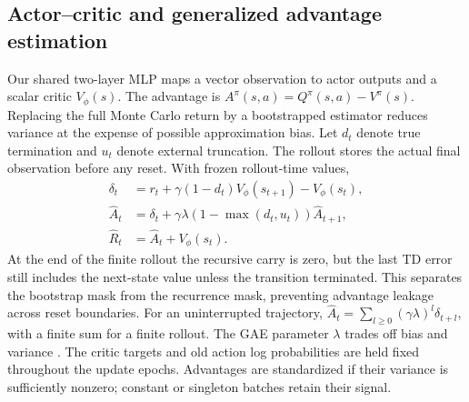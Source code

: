 \documentclass[11pt,a4paper]{article}
\begin{document}
\subsection{Actor--critic and generalized advantage estimation}
Our shared two-layer MLP maps a vector observation to actor outputs and a
scalar critic $V_\phi(s)$. The advantage is $A^\pi(s,a)=Q^\pi(s,a)-V^\pi(s)$.
Replacing the full Monte Carlo return by a bootstrapped estimator reduces
variance at the expense of possible approximation bias. Let $d_t$ denote true
termination and $u_t$ denote external truncation. The rollout stores the
actual final observation before any reset. With frozen rollout-time values,
\begin{align*}
\delta_t &= r_t+\gamma(1-d_t)V_\phi(s_{t+1})-V_\phi(s_t),\\
\hat A_t &=\delta_t+\gamma\lambda(1-\max(d_t,u_t))\hat A_{t+1},\\
\hat R_t &=\hat A_t+V_\phi(s_t).
\end{align*}
At the end of the finite rollout the recursive carry is zero, but the last
TD error still includes the next-state value unless the transition terminated.
This separates the bootstrap mask from the recurrence mask, preventing
advantage leakage across reset boundaries. For an uninterrupted trajectory,
$\hat A_t=\sum_{l\geq0}(\gamma\lambda)^l\delta_{t+l}$, with a finite sum
for a finite rollout. The GAE parameter $\lambda$ trades off bias and variance
\cite{gae}. The critic targets and old action log probabilities are held fixed
throughout the update epochs. Advantages are standardized if their variance
is sufficiently nonzero; constant or singleton batches retain their signal.
\end{document}
